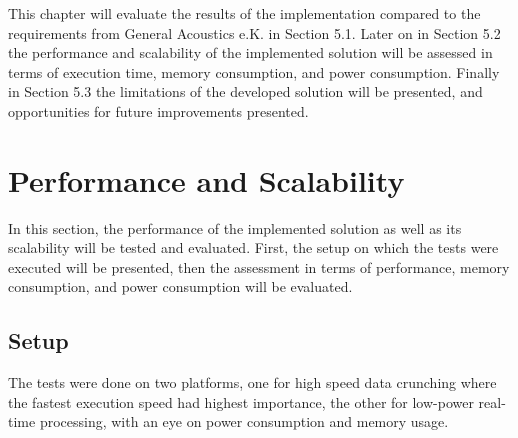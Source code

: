 

This chapter will evaluate the results of the implementation compared to the requirements from General Acoustics e.K. in Section 5.1. Later on in Section 5.2 the performance and scalability of the implemented solution will be assessed in terms of execution time, memory consumption, and power consumption. Finally in Section 5.3 the limitations of the developed solution will be presented, and opportunities for future improvements presented.


\section{Performance and Scalability}
In this section, the performance of the implemented solution as well as its scalability will be tested and evaluated. First, the setup on which the tests were executed will be presented, then the assessment in terms of performance, memory consumption, and power consumption will be evaluated.
\subsection{Setup}
The tests were done on two platforms, one for high speed data crunching where the fastest execution speed had highest importance, the other for low-power real-time processing, with an eye on power consumption and memory usage.

